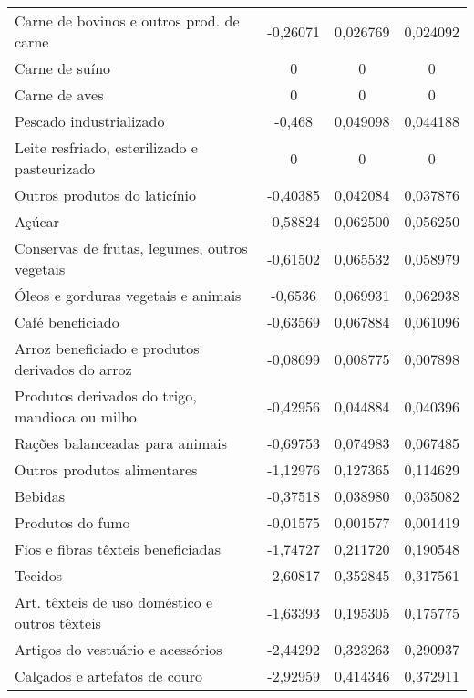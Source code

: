 \begin{apendicesenv}
\begin{small}
\begin{center}
\begin{longtable}{m{8cm}ccc}
				Carne de bovinos e outros   prod. de carne         & -0,26071 & 0,026769 & 0,024092 \\
				Carne de suíno                                     & 0 & 0 & 0 \\
				Carne de aves                                      & 0 & 0 & 0 \\
				Pescado industrializado                            & -0,468 & 0,049098 & 0,044188 \\
				Leite resfriado, esterilizado   e pasteurizado     & 0 & 0 & 0 \\
				Outros produtos do laticínio                       & -0,40385 & 0,042084 & 0,037876 \\
				Açúcar                                             & -0,58824 & 0,062500 & 0,056250 \\
				Conservas de frutas, legumes, outros vegetais      & -0,61502 & 0,065532 & 0,058979 \\
				Óleos e gorduras vegetais e animais                & -0,6536 & 0,069931 & 0,062938 \\
				Café beneficiado                                   & -0,63569 & 0,067884 & 0,061096 \\
				Arroz beneficiado e produtos derivados do arroz    & -0,08699 & 0,008775 & 0,007898 \\
				Produtos derivados do trigo, mandioca ou milho     & -0,42956 & 0,044884 & 0,040396 \\
				Rações balanceadas para animais                    & -0,69753 & 0,074983 & 0,067485 \\
				Outros produtos alimentares                        & -1,12976 & 0,127365 & 0,114629 \\
				Bebidas                                            & -0,37518 & 0,038980 & 0,035082 \\
				Produtos do fumo                                   & -0,01575 & 0,001577 & 0,001419 \\
				Fios e fibras têxteis   beneficiadas               & -1,74727 & 0,211720 & 0,190548 \\
				Tecidos                                            & -2,60817 & 0,352845 & 0,317561 \\
				Art. têxteis de uso doméstico   e outros têxteis   & -1,63393 & 0,195305 & 0,175775 \\
				Artigos do vestuário e acessórios                  & -2,44292 & 0,323263 & 0,290937 \\
				Calçados e artefatos de couro                      & -2,92959 & 0,414346 & 0,372911 \\

\end{longtable}
\end{center}
\end{small}
\end{apendicesenv}
